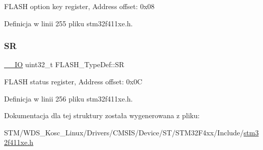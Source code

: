 F\+L\+A\+SH option key register, Address offset\+: 0x08 

Definicja w linii 255 pliku stm32f411xe.\+h.

\mbox{\label{struct_f_l_a_s_h___type_def_a52c4943c64904227a559bf6f14ce4de6}} 
\subsubsection{\texorpdfstring{SR}{SR}}
{\footnotesize\ttfamily \hyperlink{core__sc300_8h_aec43007d9998a0a0e01faede4133d6be}{\+\_\+\+\_\+\+IO} uint32\+\_\+t F\+L\+A\+S\+H\+\_\+\+Type\+Def\+::\+SR}

F\+L\+A\+SH status register, Address offset\+: 0x0C 

Definicja w linii 256 pliku stm32f411xe.\+h.



Dokumentacja dla tej struktury została wygenerowana z pliku\+:\begin{DoxyCompactItemize}
\item 
S\+T\+M/\+W\+D\+S\+\_\+\+Kosc\+\_\+\+Linux/\+Drivers/\+C\+M\+S\+I\+S/\+Device/\+S\+T/\+S\+T\+M32\+F4xx/\+Include/\hyperlink{stm32f411xe_8h}{stm32f411xe.\+h}\end{DoxyCompactItemize}
